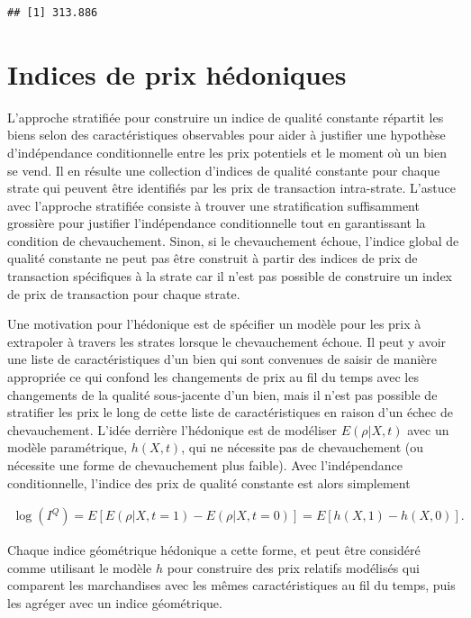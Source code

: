 \documentclass[]{article}
\begin{document}
\begin{verbatim}
## [1] 313.886
\end{verbatim}

\hypertarget{indices-de-prix-huxe9doniques}{%
\section{Indices de prix hédoniques}\label{indices-de-prix-huxe9doniques}}

L'approche stratifiée pour construire un indice de qualité constante répartit les biens selon des caractéristiques observables pour aider à justifier une hypothèse d'indépendance conditionnelle entre les prix potentiels et le moment où un bien se vend. Il en résulte une collection d'indices de qualité constante pour chaque strate qui peuvent être identifiés par les prix de transaction intra-strate. L'astuce avec l'approche stratifiée consiste à trouver une stratification suffisamment grossière pour justifier l'indépendance conditionnelle tout en garantissant la condition de chevauchement. Sinon, si le chevauchement échoue, l'indice global de qualité constante ne peut pas être construit à partir des indices de prix de transaction spécifiques à la strate car il n'est pas possible de construire un index de prix de transaction pour chaque strate.

Une motivation pour l'hédonique est de spécifier un modèle pour les prix à extrapoler à travers les strates lorsque le chevauchement échoue. Il peut y avoir une liste de caractéristiques d'un bien qui sont convenues de saisir de manière appropriée ce qui confond les changements de prix au fil du temps avec les changements de la qualité sous-jacente d'un bien, mais il n'est pas possible de stratifier les prix le long de cette liste de caractéristiques en raison d'un échec de chevauchement. L'idée derrière l'hédonique est de modéliser \(E(\rho | X, t)\) avec un modèle paramétrique, \(h(X, t)\), qui ne nécessite pas de chevauchement (ou nécessite une forme de chevauchement plus faible). Avec l'indépendance conditionnelle, l'indice des prix de qualité constante est alors simplement

\begin{align*}
\log (I^{Q}) = E[E(\rho | X, t = 1) - E(\rho | X, t = 0)] = E[h(X, 1) - h(X, 0)].
\end{align*}

Chaque indice géométrique hédonique a cette forme, et peut être considéré comme utilisant le modèle \(h\) pour construire des prix relatifs modélisés qui comparent les marchandises avec les mêmes caractéristiques au fil du temps, puis les agréger avec un indice géométrique.
\end{document}
